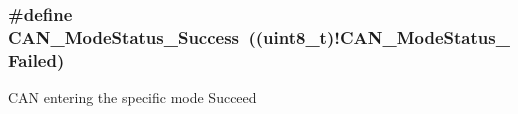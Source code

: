 \subsubsection[{C\+A\+N\+\_\+\+Mode\+Status\+\_\+\+Success}]{\setlength{\rightskip}{0pt plus 5cm}\#define C\+A\+N\+\_\+\+Mode\+Status\+\_\+\+Success~((uint8\+\_\+t)!{\bf C\+A\+N\+\_\+\+Mode\+Status\+\_\+\+Failed})}\label{group___c_a_n__operating__mode__status_ga7ca0ea503eb3b3a7c0abdfad27cb6579}
C\+A\+N entering the specific mode Succeed 
